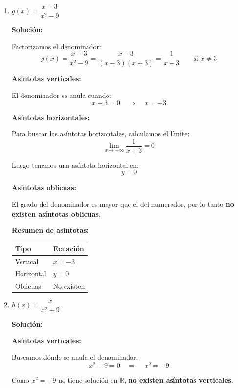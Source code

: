 \documentclass[12pt]{article}
\newcommand{\solucion}{%
    \vspace{0.8em}%
    \textbf{Solución:}%
}
\begin{document}
\begin{enumerate}[label=\alph*)]
    \newpage
    \item $g(x) = \dfrac{x-3}{x^2 - 9}$

    \solucion

    Factorizamos el denominador:
    \[
    g(x) = \frac{x-3}{x^2-9} = \frac{x-3}{(x-3)(x+3)} = \frac{1}{x+3} \qquad \text{si } x \neq 3
    \]

    \textbf{Asíntotas verticales:}

    El denominador se anula cuando:
    \[
    x + 3 = 0 \quad \Rightarrow \quad \boxed{x = -3}
    \]

    \textbf{Asíntotas horizontales:}

    Para buscar las asíntotas horizontales, calculamos el límite:
    \[
    \lim_{x \to \pm\infty} \frac{1}{x+3} = 0
    \]

    Luego tenemos una asíntota horizontal en:
    \[
    \boxed{y = 0}
    \]

    \textbf{Asíntotas oblicuas:}

    El grado del denominador es mayor que el del numerador, por lo tanto \textbf{no existen asíntotas oblicuas}.

    \vspace{0.5em}
    \textbf{Resumen de asíntotas:}

    \begin{center}
    \begin{tabular}{ll}
        \toprule
        Tipo & Ecuación \\
        \midrule
        Vertical & $x = -3$ \\
        Horizontal & $y = 0$ \\
        Oblicuas & No existen \\
        \bottomrule
    \end{tabular}
    \end{center}

    \newpage
    \item $h(x) = \dfrac{x}{x^2 + 9}$

    \solucion

    \textbf{Asíntotas verticales:}

    Buscamos dónde se anula el denominador:
    \[
    x^2 + 9 = 0 \quad \Rightarrow \quad x^2 = -9
    \]

    Como $x^2 = -9$ no tiene solución en $\mathbb{R}$, \textbf{no existen asíntotas verticales}.


\end{enumerate}
\end{document}
